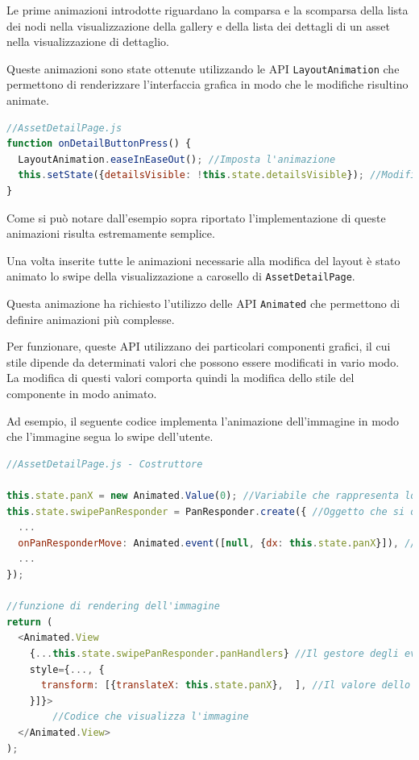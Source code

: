 Le prime animazioni introdotte riguardano la comparsa e la scomparsa della lista dei nodi nella visualizzazione della gallery e della lista dei dettagli di un asset nella visualizzazione di dettaglio.

Queste animazioni sono state ottenute utilizzando le API \texttt{LayoutAnimation} che permettono di renderizzare l'interfaccia grafica in modo che le modifiche risultino animate.
\begin{lstlisting}[language=JavaScript, caption=AssetDetailPage - Animazione della comparsa/scomparsa lista dei dettagli]
//AssetDetailPage.js
function onDetailButtonPress() {
  LayoutAnimation.easeInEaseOut(); //Imposta l'animazione
  this.setState({detailsVisible: !this.state.detailsVisible}); //Modifica lo stato del componente causandone il re-rendering
}
\end{lstlisting}
Come si può notare dall'esempio sopra riportato l'implementazione di queste animazioni risulta estremamente semplice.

Una volta inserite tutte le animazioni necessarie alla modifica del layout è stato animato lo swipe della visualizzazione a carosello di \texttt{AssetDetailPage}.

Questa animazione ha richiesto l'utilizzo delle API \texttt{Animated} che permettono di definire animazioni più complesse.

Per funzionare, queste API utilizzano dei particolari componenti grafici, il cui stile dipende da determinati valori che possono essere modificati in vario modo. La modifica di questi valori comporta quindi la modifica dello stile del componente in modo animato.

Ad esempio, il seguente codice implementa l'animazione dell'immagine in modo che l'immagine segua lo swipe dell'utente.

\begin{lstlisting}[language=JavaScript, caption=AssetDetailPage - Spostamento dell'immagine allo swipe delll'utente]
//AssetDetailPage.js - Costruttore

this.state.panX = new Animated.Value(0); //Variabile che rappresenta lo spostamento dell'immagine
this.state.swipePanResponder = PanResponder.create({ //Oggetto che si occupa di rilevare le gesture dell'utente
  ...
  onPanResponderMove: Animated.event([null, {dx: this.state.panX}]), //All'evento onPanResponderMove, che viene sollevato quando l'utente esegue un pan (equivalente del drag'n'drop nei dispositivi touchscreen) viene collegata la variabile panX, in modo che il valore della variabile venga modificato e che la modifica venga effettuata in modo animato
  ...
});

//funzione di rendering dell'immagine
return (
  <Animated.View
    {...this.state.swipePanResponder.panHandlers} //Il gestore degli eventi viene collegato alla View
    style={..., {
      transform: [{translateX: this.state.panX},  ], //Il valore dello spostamento viene associato allo stile della View, in particolare alla traslazione sull'asse X
    }]}>
    	//Codice che visualizza l'immagine
  </Animated.View>
);
\end{lstlisting}

